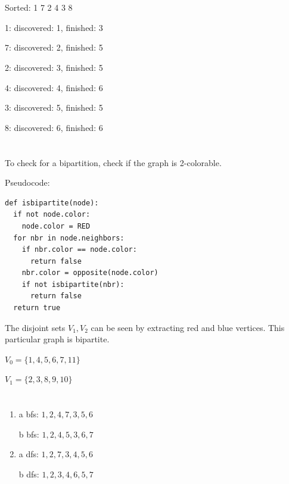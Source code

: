 \documentclass[a4paper,12pt]{article}
\begin{document}
\section{}
Sorted: 1 7 2 4 3 8

1: discovered: 1, finished: 3

7: discovered: 2, finished: 5

2: discovered: 3, finished: 5

4: discovered: 4, finished: 6

3: discovered: 5, finished: 5

8: discovered: 6, finished: 6

\section{}
To check for a bipartition, check if the graph is 2-colorable.

Pseudocode:
\begin{lstlisting}
def isbipartite(node):
  if not node.color:
    node.color = RED
  for nbr in node.neighbors:
    if nbr.color == node.color:
      return false
    nbr.color = opposite(node.color)
    if not isbipartite(nbr):
      return false
  return true
\end{lstlisting}
The disjoint sets $V_1, V_2$ can be seen by extracting red and blue vertices.
This particular graph is bipartite.

$V_0 = \{1, 4, 5, 6, 7, 11\}$

$V_1 = \{2, 3, 8, 9, 10\}$

\section{}
\begin{enumerate}
  \item a bfs: $1, 2, 4, 7, 3, 5, 6$

    b bfs: $1, 2, 4, 5, 3, 6, 7$
  \item a dfs: $1, 2, 7, 3, 4, 5, 6$

    b dfs: $1, 2, 3, 4, 6, 5, 7$
\end{enumerate}
\end{document}
